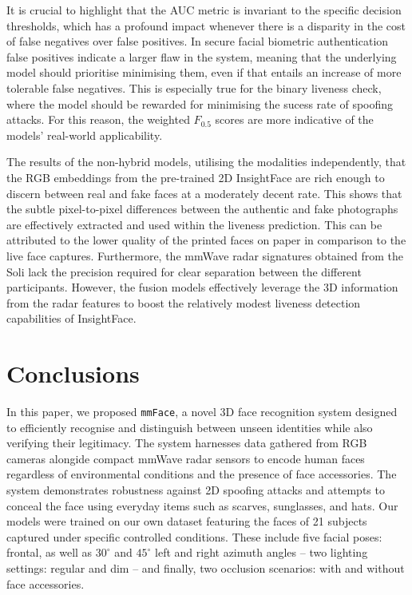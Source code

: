 \documentclass{mpaper}
\begin{document}
It is crucial to highlight that the AUC metric is invariant to the specific decision thresholds, which has a profound impact whenever there is a disparity in the cost of false negatives over false positives. In secure facial biometric authentication false positives indicate a larger flaw in the system, meaning that the underlying model should prioritise minimising them, even if that entails an increase of more tolerable false negatives. This is especially true for the binary liveness check, where the model should be rewarded for minimising the sucess rate of spoofing attacks. For this reason, the weighted $F_{0.5}$ scores are more indicative of the models' real-world applicability. 

The results of the non-hybrid models, utilising the modalities independently, that the RGB embeddings from the pre-trained 2D InsightFace are rich enough to discern between real and fake faces at a moderately decent rate. This shows that the subtle pixel-to-pixel differences between the authentic and fake photographs are effectively extracted and used within the liveness prediction. This can be attributed to the lower quality of the printed faces on paper in comparison to the live face captures. Furthermore, the mmWave radar signatures obtained from the Soli lack the precision required for clear separation between the different participants. However, the fusion models effectively leverage the 3D information from the radar features to boost the relatively modest liveness detection capabilities of InsightFace.



\section{Conclusions}
In this paper, we proposed \texttt{mmFace}, a novel 3D face recognition system designed to efficiently recognise and distinguish between unseen identities while also verifying their legitimacy. The system harnesses data gathered from RGB cameras alongide compact mmWave radar sensors to encode human faces regardless of environmental conditions and the presence of face accessories. The system demonstrates robustness against 2D spoofing attacks and attempts to conceal the face using everyday items such as scarves, sunglasses, and hats. Our models were trained on our own dataset featuring the faces of 21 subjects captured under specific controlled conditions. These include five facial poses: frontal, as well as $30^\circ$ and $45^\circ$ left and right azimuth angles -- two lighting settings: regular and dim -- and finally, two occlusion scenarios: with and without face accessories.
\end{document}
